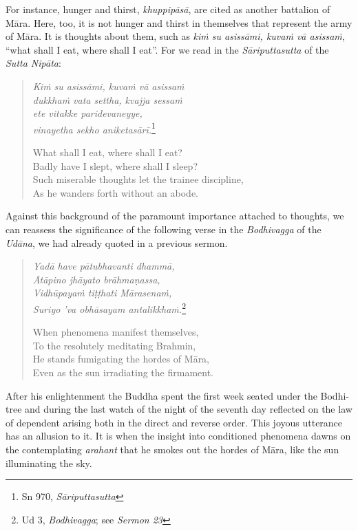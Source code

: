 For instance, hunger and thirst, \emph{khuppipāsā}, are cited as another battalion of Māra. Here, too, it is not hunger and thirst in themselves that represent the army of Māra. It is thoughts about them, such as \emph{kiṁ su asissāmi, kuvaṁ vā asissaṁ}, ``what shall I eat, where shall I eat''. For we read in the \emph{Sāriputtasutta} of the \emph{Sutta Nipāta}:

\begin{quote}
\emph{Kiṁ su asissāmi, kuvaṁ vā asissaṁ}\\
\emph{dukkhaṁ vata settha, kvajja sessaṁ}\\
\emph{ete vitakke paridevaneyye,}\\
\emph{vinayetha sekho aniketasārī.}\footnote{Sn 970, \emph{Sāriputtasutta}}

What shall I eat, where shall I eat?\\
Badly have I slept, where shall I sleep?\\
Such miserable thoughts let the trainee discipline,\\
As he wanders forth without an abode.
\end{quote}

Against this background of the paramount importance attached to thoughts, we can reassess the significance of the following verse in the \emph{Bodhivagga} of the \emph{Udāna}, we had already quoted in a previous sermon.

\begin{quote}
\emph{Yadā have pātubhavanti dhammā,}\\
\emph{Ātāpino jhāyato brāhmaṇassa,}\\
\emph{Vidhūpayaṁ tiṭṭhati Mārasenaṁ,}\\
\emph{Suriyo 'va obhāsayam antalikkhaṁ.}\footnote{Ud 3, \emph{Bodhivagga}; see \emph{Sermon 23}}

When phenomena manifest themselves,\\
To the resolutely meditating Brahmin,\\
He stands fumigating the hordes of Māra,\\
Even as the sun irradiating the firmament.
\end{quote}

After his enlightenment the Buddha spent the first week seated under the Bodhi-tree and during the last watch of the night of the seventh day reflected on the law of dependent arising both in the direct and reverse order. This joyous utterance has an allusion to it. It is when the insight into conditioned phenomena dawns on the contemplating \emph{arahant} that he smokes out the hordes of Māra, like the sun illuminating the sky.

